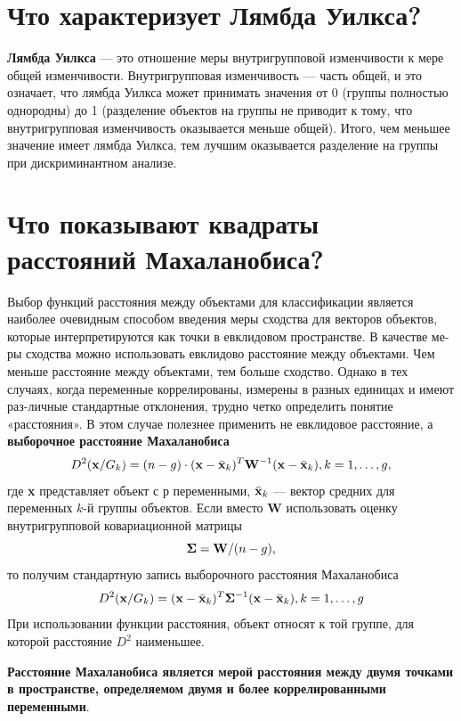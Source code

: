 \documentclass[a4paper, 12pt]{article}
\begin{document}
\section{Что характеризует Лямбда Уилкса?}
\textbf{Лямбда Уилкса} — это отношение меры внутригрупповой изменчивости к мере общей изменчивости. Внутригрупповая изменчивость — часть общей, и это означает, что лямбда Уилкса может принимать значения от 0 (группы полностью однородны) до 1 (разделение объектов на группы не приводит к тому, что внутригрупповая изменчивость оказывается меньше общей). Итого, чем меньшее значение имеет лямбда Уилкса, тем лучшим оказывается разделение на группы при дискриминантном анализе.

\section{Что показывают квадраты расстояний Махаланобиса?}
Выбор функций расстояния между объектами для классификации является наиболее очевидным способом введения меры сходства для векторов объектов, которые интерпретируются как точки в евклидовом пространстве. В качестве ме-ры сходства можно использовать евклидово расстояние между объектами. Чем меньше расстояние между объектами, тем больше сходство. Однако в тех случаях, когда переменные коррелированы, измерены в разных единицах и имеют раз-личные стандартные отклонения, трудно четко определить понятие «расстояния». В этом случае полезнее применить не евклидовое расстояние, а \textbf{выборочное расстояние Махаланобиса } 
 \begin{equation}
     D^2({\bf x}/G_k)=(n-g)\cdot ({\bf x}-\bar{\bf x}_k)^T {\bf W}^{-1} ({\bf x}-\bar{\bf x}_k), k=1,\dots,g ,
 \end{equation}
 где \textbf{x} представляет объект с $р$ переменными, $\bar{\bf x}_k$ --- вектор средних для переменных $k$-й группы объектов. Если вместо \textbf{W}   использовать оценку внутригрупповой ковариационной матрицы  
\begin{equation}
    {\bf \Sigma}={\bf W}/(n-g),
\end{equation}
то получим стандартную запись выборочного расстояния Махаланобиса
\begin{equation}
    D^2({\bf x}/G_k)= ({\bf x}-\bar{\bf x}_k)^T {\bf \Sigma}^{-1} ({\bf x}-\bar{\bf x}_k), k=1,\dots,g
\end{equation}
При использовании функции расстояния, объект относят к той группе, для которой расстояние  $D^2$ наименьшее.

\textbf{Расстояние Махаланобиса является мерой расстояния между двумя точками в пространстве, определяемом двумя и более коррелированными переменными}. 
\end{document}

